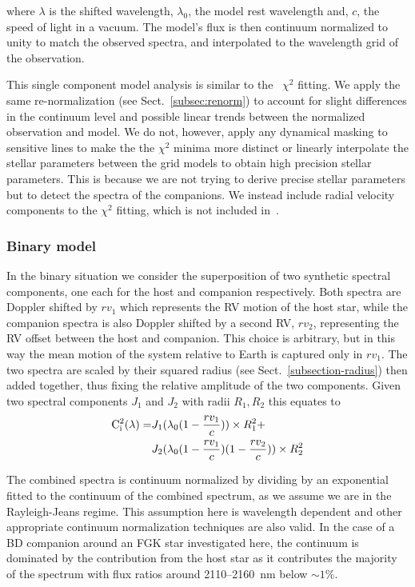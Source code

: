 \documentclass[fleqn,usenatbib]{mnras}
\begin{document}
where \(\lambda\) is the shifted wavelength, \(\lambda_0\), the model rest wavelength and, \(c\), the speed of light in a vacuum. The model's flux is then continuum normalized to unity to match the observed spectra, and interpolated to the wavelength grid of the observation.

This single component model analysis is similar to the~\citet{passegger_fundamental_2016} \(\chi^2\) fitting. We apply the same re-normalization (see Sect.~\ref{subsec:renorm}) to account for slight differences in the continuum level and possible linear trends between the normalized observation and model. We do not, however, apply any dynamical masking to sensitive lines to make the the \(\chi^2\) minima more distinct or linearly interpolate the stellar parameters between the grid models to obtain high precision stellar parameters. This is because we are not trying to derive precise stellar parameters but to detect the spectra of the companions. We instead include radial velocity components to the \(\chi^2\) fitting, which is not included in~\citet{passegger_fundamental_2016}. 


\subsubsection{Binary model}
\label{subsubsec:binary-model}
In the binary situation we consider the superposition of two synthetic spectral components, one each for the host and companion respectively. Both spectra are Doppler shifted by \({rv}_1\) which represents the RV motion of the host star, while the companion spectra is also Doppler shifted by a second RV, \({rv}_2 \), representing the RV offset between the host and companion. This choice is arbitrary, but in this way the mean motion of the system relative to Earth is captured only in \({rv}_1\). The two spectra are scaled by their squared radius (see Sect.~\ref{subsection-radius}) then added together, thus fixing the relative amplitude of the two components. 
Given two spectral components \(J_{1} \) and \(J_{2} \) with radii \(R_1, R_2\) this equates to
\begin{align}
\rm C^{2}_{i}(\lambda) = &  J_{1}(\lambda_{0}(1 - \frac{rv_{1}}{c}))\times R_{1}^2 +\nonumber \\
& J_{2}(\lambda_{0}(1-\frac{rv_{1}}{c})(1-\frac{rv_{2}}{c}))\times R_{2}^2
\end{align}


The combined spectra is continuum normalized by dividing by an exponential fitted to the continuum of the combined spectrum, as we assume we are in the Rayleigh-Jeans regime. This assumption here is wavelength dependent and other appropriate continuum normalization techniques are also valid. In the case of a BD companion around an FGK star investigated here, the continuum is dominated by the contribution from the host star as it contributes the majority of the spectrum with flux ratios around 2110--2160~nm below \(\sim1\%\).
\end{document}
